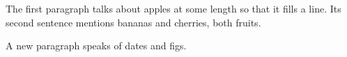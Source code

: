 \documentclass{article}
\begin{document}
The first paragraph talks about apples at some length so that it fills a line.
Its second sentence mentions bananas and cherries, both fruits.

A new paragraph speaks of dates and figs.
\end{document}
